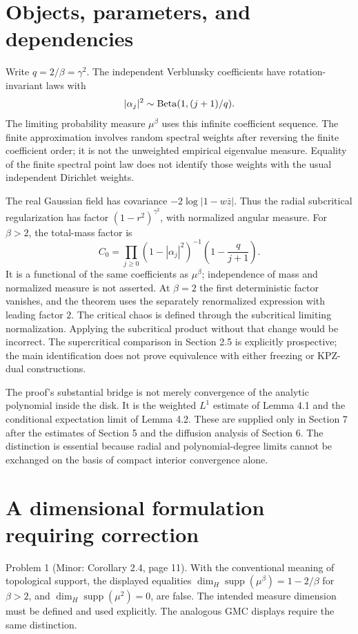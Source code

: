 \documentclass[10pt]{article}
\begin{document}
\section*{Objects, parameters, and dependencies}
Write \(q=2/\beta=\gamma^2\). The independent Verblunsky coefficients have rotation-invariant laws with \[|\alpha_j|^2\sim{\rm Beta}(1,(j+1)/q).\] The limiting probability measure \(\mu^\beta\) uses this infinite coefficient sequence. The finite approximation involves random spectral weights after reversing the finite coefficient order; it is not the unweighted empirical eigenvalue measure. Equality of the finite spectral point law does not identify those weights with the usual independent Dirichlet weights.\par
The real Gaussian field has covariance \(-2\log|1-w\bar z|\). Thus the radial subcritical regularization has factor \((1-r^2)^{\gamma^2}\), with normalized angular measure. For \(\beta>2\), the total-mass factor is \[C_0=\prod_{j\ge0}(1-|\alpha_j|^2)^{-1}
                       \left(1-\frac{q}{j+1}\right).\] It is a functional of the same coefficients as \(\mu^\beta\); independence of mass and normalized measure is not asserted. At \(\beta=2\) the first deterministic factor vanishes, and the theorem uses the separately renormalized expression with leading factor \(2\). The critical chaos is defined through the subcritical limiting normalization. Applying the subcritical product without that change would be incorrect. The supercritical comparison in Section 2.5 is explicitly prospective; the main identification does not prove equivalence with either freezing or KPZ-dual constructions.\par
The proof’s substantial bridge is not merely convergence of the analytic polynomial inside the disk. It is the weighted \(L^1\) estimate of Lemma 4.1 and the conditional expectation limit of Lemma 4.2. These are supplied only in Section 7 after the estimates of Section 5 and the diffusion analysis of Section 6. The distinction is essential because radial and polynomial-degree limits cannot be exchanged on the basis of compact interior convergence alone.\par
\section*{A dimensional formulation requiring correction}
Problem 1 (Minor: Corollary 2.4, page 11).  With the conventional meaning of topological support, the displayed equalities \(\dim_H\operatorname{supp}(\mu^\beta)=1-2/\beta\) for \(\beta>2\), and \(\dim_H\operatorname{supp}(\mu^2)=0\), are false. The intended measure dimension must be defined and used explicitly. The analogous GMC displays require the same distinction.\par
\end{document}
